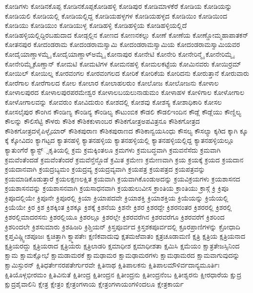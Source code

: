{ಕೋಡಿಗಳು
ಕೋಡಿನಕೊಪ್ಪ
ಕೋಡಿನಕೊಪ್ಪಕೋಡಿಹಳ್ಳಿ
ಕೋಡಿಪುರ
ಕೋಡಿಮಾಳಕೆರೆ
ಕೋಡಿಯ
ಕೋಡಿಯನ್ನು
ಕೋಡಿಯಲಿ
ಕೋಡಿಯಲ್ಲಿ
ಕೋಡಿಯಲ್ಲಿದ್ದ
ಕೋಡಿಯಹಳ್ಳಗಳ
ಕೋಡಿಯಹಳ್ಳದ
ಕೋಡಿಯಿಂ
ಕೋಡಿಯಿಂದ
ಕೋಡಿಯು
ಕೋಡಿಯುಂ
ಕೋಡಿಯುಳ್ಳ
ಕೋಡಿಹಳ್ಳಿ
ಕೋಡಿಹಳ್ಳಿಯ
ಕೋಡಿಹಳ್ಳಿಯಲ್ಲಿದೆ
ಕೋಡಿಹಳ್ಳಿಯಲ್ಲಿದ್ದಿರಬಹುದಾದ
ಕೋಡ್ಗಲ್ಲಿನ
ಕೋಣದ
ಕೋಣನಕಲ್ಲು
ಕೋಣೆ
ಕೋಣೆಯ
ಕೋಣ್ಡೋಮ್ಮಹಾಪಾತಕನ್
ಕೋತನಪುರ
ಕೋದಂಡರಾಮ
ಕೋದಂಡರಾಮಸ್ವಾಮಿ
ಕೋದಂಡರಾಮಸ್ವಾಮಿಯ
ಕೋದಂಡರಾಮಸ್ವಾಮಿಯವರ
ಕೋದೈಯಾಣ್ಡಾಳಮ್ಮೈ
ಕೋದೈಯಾಣ್ಡಾಳ್ಅಮ್ಮೈ
ಕೋನಾಪುರ
ಕೋನೇಟಿ
ಕೋನೇರಿ
ಕೋನೇರಿನ್ಮೈ
ಕೋನೇರಿಮ್ಮೈ
ಕೋನೇರಿಮ್ಮೈಕೊಣ್ಡಾನ್
ಕೋಮಟಿ
ಕೋಮಟಿಗಳ
ಕೋಮನಹಳ್ಳಿ
ಕೋಮಲಕಟ್ಟೆಯ
ಕೋಮಿನವರು
ಕೋಯಿರ್ರಮ್
ಕೋಯಿಲ್
ಕೋಯಿಲ್ನ
ಕೋರವಂಗಲ
ಕೋರವಂಗಲದ
ಕೋರಿಕೆ
ಕೋರಿಕೆಯ
ಕೋರಿದನು
ಕೋರುತ್ತಾನೆ
ಕೋರುವಾರು
ಕೋರೆಗಾಲ
ಕೋರೆಗಾಲದ
ಕೋಲ
ಕೋಲಾರ
ಕೋಲಾಹಲರುಂ
ಕೋಲೋಜ
ಕೋಲೋಜನು
ಕೋಳಾಲ
ಕೋಳಾಲಪುರದ
ಕೋಳಾಲಪುರಪರಮೇಶ್ವರ
ಕೋಳಾಲಬಯಲುನಾಡುಮಂ
ಕೋಳಾಹಳ
ಕೋಳಿಗಾಲ
ಕೋಳೋಗಾಲ
ಕೋಳೋಗಾಲವನ್ನು
ಕೋವರುಂ
ಕೋವಿದುರುಂ
ಕೋಶದಲ್ಲಿ
ಕೋಶವು
ಕೋಶಸ್ಯ
ಕೋಶಾಧಿಕಾರಿ
ಕೋಸಲ
ಕೋಸಲೈಪುರ
ಕೌಂಗಿನ
ಕೌಂಡಿಣ್ಯ
ಕೌಂಡಿನ್ಯ
ಕೌಂಡಿಲ್ಯ
ಕೌಟುಂಬಿಕ
ಕೌಡಲಿ
ಕೌಡಲಿಇಂದಿನ
ಕೌಡ್ಲೆ
ಕೌಡ್ಲೆಯು
ಕೌಣ್ಡಿಲ್ಯ
ಕೌಲನ್ನು
ಕೌಲಿಸೆಟ್ಟಿ
ಕೌಳರು
ಕೌಶಿಕ
ಕೌಶಿಕಕುಳಾಂಬರ
ಕೌಶಿಕಗೋತ್ರಅಪವಿತ್ರನೂ
ಕೌಶಿಕಗೋತ್ರದ
ಕೌಶಿಕಗೋತ್ರದಳೈಪಿಳ್ಳೈಯಾರ್
ಕೌಶಿಕಪುರಾಣ
ಕೌಶಿಕಪುರಾಣದ
ಕೌಶಿಕಾನ್ವಯಸಿಂಧು
ಕೌಸಲ್ಯ
ಕೌಸಲ್ಯಾ
ಕ್ಕðದ
ಕ್ಕಾಗಿ
ಕ್ಕೂ
ಕ್ಕೆ
ಕ್ಕೋವಿದಂ
ಕ್ಯಾಗಟ್ಟದ
ಕ್ಯಾತನಹಳ್ಳಿ
ಕ್ಯಾತನಹಳ್ಳಿಯ
ಕ್ಯಾತನಹಳ್ಳಿಯಲ್ಲಿ
ಕ್ಯಾತನಹಳ್ಳಿಯಲ್ಲಿದ್ದ
ಕ್ಯಾತನಹಳ್ಳಿಯಲ್ಲೂ
ಕ್ಯಾತುಂಗೆರೆ
ಕ್ಯಾಸ್ಟ್್ಸಕೃತಿಯಲ್ಲಿ
ಕ್ರಮ
ಕ್ರಮಕ್ಕಿಂತಲೂ
ಕ್ರಮಗಳು
ಕ್ರಮಬದ್ಧವಾಗಿ
ಕ್ರಮವನೆಸೆದು
ಕ್ರಮವಾಗಿ
ಕ್ರಮವೆಂತೆಂದಡೆ
ಕ್ರಮವೆಂತೆಂದರೆ
ಕ್ರಮವೆನ್ತೆನ್ದೊಡೆ
ಕ್ರಮಿತ
ಕ್ರಮೇಣ
ಕ್ರಮೇಣವಾಗಿ
ಕ್ರಯ
ಕ್ರಯಕ್ಕೆ
ಕ್ರಯದ
ಕ್ರಯದಾನ
ಕ್ರಯದಾನವಾಗಿ
ಕ್ರಯದ್ರಬ್ಯಮಂ
ಕ್ರಯದ್ರವ್ಯ
ಕ್ರಯದ್ರವ್ಯವಾಗಿ
ಕ್ರಯಪತ್ರ
ಕ್ರಯಪತ್ರದ
ಕ್ರಯಪತ್ರವನ್ನು
ಕ್ರಯಮಾಡಿಕೊಡುತ್ತಾರೆ
ಕ್ರಯಲಕ್ಷಣಲಕ್ಷಿತ
ಕ್ರಯವಾಗಿ
ಕ್ರಯವಾಗಿಕೊಂಡುಅದನ್ನು
ಕ್ರಯವಿಕ್ರಯಗಳು
ಕ್ರಯಶಾಸನದ
ಕ್ರಯಶಾಸನವನ್ನು
ಕ್ರಯಶಾಸನವಾಗಿ
ಕ್ರಯಸಾಧನವಾಗಿ
ಕ್ರಯಹುಲುವೀಸ
ಕ್ರಾಂತಿಯ
ಕ್ರಾಂತಿಯು
ಕ್ರಾಸ್ಗೆ
ಕ್ರಿ
ಕ್ರಿಪೂ
ಕ್ರಿಪೂದಲ್ಲಿಯೇ
ಕ್ರಿಪೂನೇ
ಕ್ರಿಪೂರಲ್ಲಿ
ಕ್ರಿಯಾ
ಕ್ರಿಯಾಪದವೇ
ಕ್ರಿಯಾಶಕ್ತಿ
ಕ್ರಿಯಾಶಕ್ತಿಯ
ಕ್ರಿಯೆಯನ್ನು
ಕ್ರಿಯೆಯಲ್ಲಿ
ಕ್ರಿಯೆಯೇ
ಕ್ರಿರ
ಕ್ರಿಶ
ಕ್ರಿಶಕ್ಕಿಂತ
ಕ್ರಿಶಕ್ಕೂ
ಕ್ರಿಶಕ್ಕೆ
ಕ್ರಿಶನೆಯ
ಕ್ರಿಶನೇ
ಕ್ರಿಶರ
ಕ್ರಿಶರದ್ದೇ
ಕ್ರಿಶರನಂತರ
ಕ್ರಿಶರರಲ್ಲಿ
ಕ್ರಿಶರಲ್ಲಿ
ಕ್ರಿಶರಲ್ಲಿಮಾದರಸನು
ಕ್ರಿಶರಲ್ಲಿಯೂ
ಕ್ರಿಶರಲ್ಲೂ
ಕ್ರಿಶರಲ್ಲೇ
ಕ್ರಿಶರವರೆಗಿನ
ಕ್ರಿಶರವರೆಗೂ
ಕ್ರಿಶರವರೆಗೆ
ಕ್ರಿಶರಿಂದ
ಕ್ರಿಶರಿಂದಲೇ
ಕ್ರಿಶಸುಮಾರು
ಕ್ರಿಶಹಿಜರಿ
ಕ್ರಿಶ್ಚಿಯನ್
ಕ್ರಿಸ್ತಪೂರ್ವದ
ಕ್ರಿಸ್ತಶಕಪೂರ್ವದಲ್ಲಿ
ಕ್ರೂರಪ್ರಾಣಿಗಳನ್ನು
ಕ್ರೋಧಾದಿ
ಕ್ಲಪ್ತವಿಷ್ಣ್ವೀಶಪೂಜಃ
ಕ್ವಚಿತ್ತಾಗಿ
ಕ್ವ್ಮಾಪತೇಃ
ಕ್ಷಣಿಕವಾದುವು
ಕ್ಷತಮಱೆವಾತಂ
ಕ್ಷತ್ರಚೂಡಾಮಣಿ
ಕ್ಷತ್ರಿ
ಕ್ಷತ್ರಿಯ
ಕ್ಷತ್ರಿಯನಾದ
ಕ್ಷತ್ರಿಯರದ್ದು
ಕ್ಷತ್ರಿಯರಾದ
ಕ್ಷತ್ರಿಯರು
ಕ್ಷತ್ರಿಲಾಡರಿ
ಕ್ಷಮಾಧೀಶ
ಕ್ಷಮಾಧೀಶತಾ
ಕ್ಷಮಿಸಿ
ಕ್ಷಮೆಯಂ
ಕ್ಷಾತ್ರತೇಜಸ್ಸಿನಿಂದ
ಕ್ಷಾಮ
ಕ್ಷಾಮಕ್ಷೋಭೆ
ಕ್ಷಾಮಡಾಮರಕೆ
ಕ್ಷಾಮಢಾಮರ
ಕ್ಷಾಮಢಾಮರಗಳು
ಕ್ಷಾಮಢಾಮರದ
ಕ್ಷಾಮವಾಗುವುದನ್ನು
ಕ್ಷಾಮಿಸ್ಫುರನ್
ಕ್ಷಿತಿಧರ್ತೇನರಪತೇರ್ಗುರವೇ
ಕ್ಷಿತಿನಾಥ
ಕ್ಷಿತಿಪಾಲಕನು
ಕ್ಷಿತಿಪಾಲಮೌಳಿರ್ವದಾನ್ಯಮೂರ್ತಿಃ
ಕ್ಷಿತಿಯೊಳ್ಗಭೀರಮಂ
ಕ್ಷಿತಿವಿನುತೆ
ಕ್ಷಿತೀಂದ್ರ
ಕ್ಷಿತೀಂದ್ರನ
ಕ್ಷಿತೀಂದ್ರನು
ಕ್ಷಿತೀಂದ್ರನೆಂಬ
ಕ್ಷಿತೀಶ್ವರನು
ಕ್ಷೀರಧಾರೆಯ
ಕ್ಷುದ್ರ
ಕ್ಷುದ್ರಶೈವಾಲಿನಿ
ಕ್ಷೇತ್ರ
ಕ್ಷೇತ್ರಂ
ಕ್ಷೇತ್ರಂಗಳಾಯ
ಕ್ಷೇತ್ರಂಗಳಾಯಂಗಳಿಂದಲೂ
ಕ್ಷೇತ್ರಕಾರ್ಯ
}
